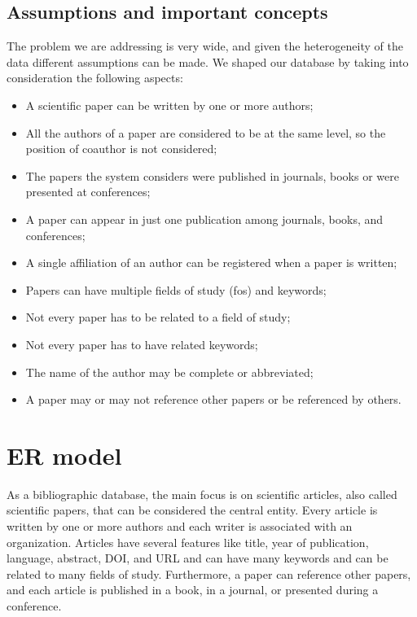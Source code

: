 \section{Assumptions and important concepts}
\label{sec:assumptions_and_important_concepts}%
The problem we are addressing is very wide, and given the heterogeneity of the data different assumptions can be made.
We shaped our database by taking into consideration the following aspects:
\begin{itemize}
    \item A scientific paper can be written by one or more authors;
    \item All the authors of a paper are considered to be at the same level, so the position of coauthor is not considered;
    \item The papers the system considers were published in journals, books or were presented at conferences;
    \item A paper can appear in just one publication among journals, books, and conferences;
    \item A single affiliation of an author can be registered when a paper is written;
    \item Papers can have multiple fields of study (fos) and keywords;
    \item Not every paper has to be related to a field of study;
    \item Not every paper has to have related keywords;
    \item The name of the author may be complete or abbreviated;
    \item A paper may or may not reference other papers or be referenced by others.
\end{itemize}


\chapter{ER model}
\label{ch:er_model}%
As a bibliographic database, the main focus is on scientific articles, also called scientific papers, that can be considered the central entity.
Every article is written by one or more authors and each writer is associated with an organization.
Articles have several features like title, year of publication, language, abstract, DOI, and URL and can have many keywords and can be related to many fields of study.
Furthermore, a paper can reference other papers, and each article is published in a book, in a journal, or presented during a conference.


